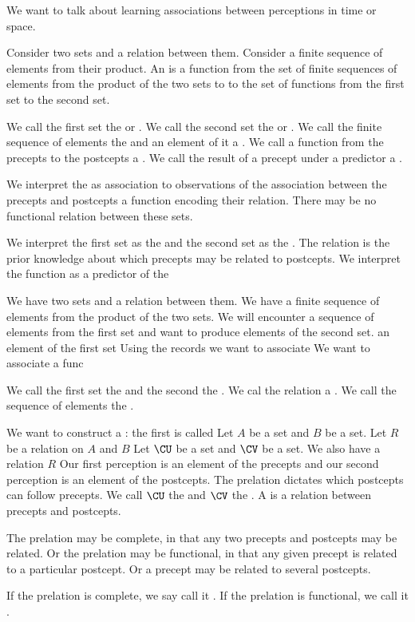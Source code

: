 

We want to talk about learning
associations between perceptions
in time or space.


Consider two sets
and a relation between them.
Consider a finite sequence of elements
from their product.
An  is a function
from the set of finite sequences of
elements from the product of the two
sets to to the set of functions from
the first set to the second set.

We call the first set the
 or
.
We call the second set the
 or
.
We call the finite sequence of
elements the 
and an element of it a .
We call a function from the precepts
to the postcepts a .
We call the result of a precept
under a predictor a .

We interpret the  as
association to observations of the
association between the precepts
and postcepts a function encoding
their relation. There may be no
functional relation between these
sets.

We interpret the first set
as the 
and the second set as the
. The relation
is the prior knowledge about
which precepts may be related to
postcepts.
We interpret the function as a
predictor of the



We have two sets and a relation
between them.
We have a finite sequence of
elements from the product of
the two sets.
We will encounter a sequence of
elements from the first set
and want to produce elements of
the second set.
an element
of the first set
Using the records we want to
associate
We want to associate a func

We call the first set the
 and the second the
. We cal the relation
a .
We call the sequence of elements
the .

We want to construct a
: the
first is called
Let $A$ be a set and $B$
be a set. Let $R$ be a relation
on $A$ and $B$
Let $\CU$ be a set
and $\CV$ be a set.
We also have a relation $R$
Our first perception is an
element of the precepts and
our second perception is an
element of the postcepts.
The prelation dictates which
postcepts can follow precepts.
We call $\CU$ the
and $\CV$ the .
A  is
a relation between precepts
and postcepts.


The prelation may be
complete, in that any two precepts
and postcepts may be related.
Or the prelation may
be functional, in that any given
precept is related to a particular
postcept.
Or a precept may be related
to several postcepts.

If the prelation is complete, we say
call it .
If the prelation is functional, we call
it .
